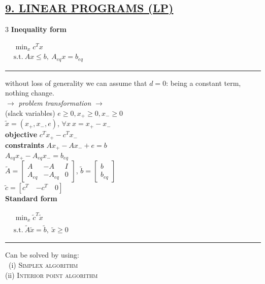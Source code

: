 \documentclass[a4paper]{article}
\begin{document}
\subsection*{\color{cyan}
\textsf{
    \underline{9. LINEAR PROGRAMS (LP)}}}
\vspace{-0.3cm}
\raggedcolumns
\begin{multicols}{3}
    \noindent
    \textbf{Inequality form}
    \begin{center}
        $\begin{aligned}
            &\min_{x} c^T{x}\\
            &\text{s.t.}\ Ax\le{b}, \ A_{eq}x=b_{eq}            
        \end{aligned}$
    \end{center}
    \hrule
    without loss of generality we can assume that $d=0$: being a constant  term, nothing change.
    \newcolumn\\
    \textsf{$\longrightarrow$ \textit{problem transformation} $\longrightarrow$}\\
    {\small{
        (slack variables) $e\ge0, x_{+}\ge0, x_{-}\ge0$\\
        $\tilde{x}=(x_{+}, x_{-}, e)$, $\forall{x} \ x=x_{+}-x_{-}$\\
        \textbf{objective} $c^Tx_{+}-c^T{x_{-}}$\\
        \textbf{constraints}
        $Ax_{+}-Ax_{-}+e={b}$ \\
        $A_{eq}x_{+}-A_{eq}x_{-}=b_{eq}$\\
        $\tilde{A}=\begin{bmatrix}
            A&-A&I\\
            A_{eq}&-A_{eq}&0
        \end{bmatrix}$, $\tilde{b}=\begin{bmatrix}
            b\\b_{eq}
        \end{bmatrix}$\\
        $\tilde{c}=[c^T\quad{-c^T}\quad{0}]$
    }}
    \newcolumn\\
    \textbf{Standard form}
    \begin{center}
        $\begin{aligned}
            &\min_{x} {\tilde{c}^T{\tilde{x}}}\\
            &\text{s.t.} \ \tilde{A}\tilde{x}=\tilde{b}, \ \tilde{x}\ge0
        \end{aligned}$
    \end{center}
    \hrule
    Can be solved by using:\\
         \ (i) \textsc{Simplex algorithm}\\
        (ii) \textsc{Interior point algorithm}\\
\end{multicols}
\end{document}
